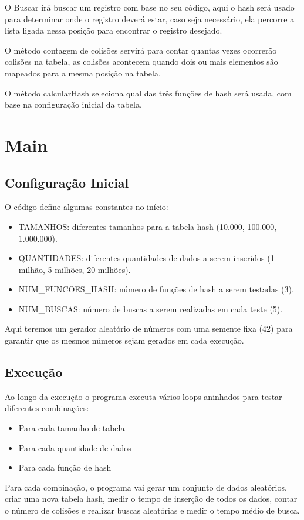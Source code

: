 \documentclass{article}
\begin{document}
O Buscar irá buscar um registro com base no seu código, aqui o hash será usado para determinar onde o registro deverá estar, caso seja necessário, ela percorre a lista ligada nessa posição para encontrar o registro desejado.

O método contagem de colisões servirá para contar quantas vezes ocorrerão colisões na tabela, as colisões acontecem quando dois ou mais elementos são mapeados para a mesma posição na tabela.

O método calcularHash seleciona qual das três funções de hash será usada, com base na configuração inicial da tabela.

\section{Main}
\subsection{Configuração Inicial}
O código define algumas constantes no início:
\begin{itemize}
    \item TAMANHOS: diferentes tamanhos para a tabela hash (10.000, 100.000, 1.000.000).
    \item QUANTIDADES: diferentes quantidades de dados a serem inseridos (1 milhão, 5 milhões, 20 milhões).
    \item NUM\_FUNCOES\_HASH: número de funções de hash a serem testadas (3).
    \item NUM\_BUSCAS: número de buscas a serem realizadas em cada teste (5).
\end{itemize}

Aqui teremos um gerador aleatório de números com uma semente fixa (42) para garantir que os mesmos números sejam gerados em cada execução.

\subsection{Execução}
Ao longo da execução o programa executa vários loops aninhados para testar diferentes combinações:
\begin{itemize}
    \item Para cada tamanho de tabela
    \item Para cada quantidade de dados
    \item Para cada função de hash
\end{itemize}

Para cada combinação, o programa vai gerar um conjunto de dados aleatórios, criar uma nova tabela hash, medir o tempo de inserção de todos os dados, contar o número de colisões e realizar buscas aleatórias e medir o tempo médio de busca.
\end{document}
